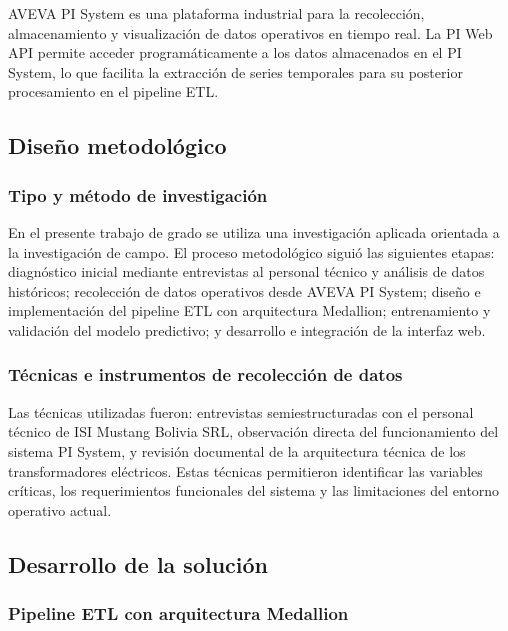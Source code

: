 \documentclass{univalle-perfil}
\begin{document}
AVEVA PI System es una plataforma industrial para la recolección, almacenamiento
y visualización de datos operativos en tiempo real. La PI Web API permite acceder
programáticamente a los datos almacenados en el PI System, lo que facilita la
extracción de series temporales para su posterior procesamiento en el pipeline ETL.


\subsection{Diseño metodológico}

\subsubsection{Tipo y método de investigación}

En el presente trabajo de grado se utiliza una investigación aplicada orientada a la
investigación de campo. El proceso metodológico siguió las siguientes etapas:
diagnóstico inicial mediante entrevistas al personal técnico y análisis de datos
históricos; recolección de datos operativos desde AVEVA PI System; diseño e
implementación del pipeline ETL con arquitectura Medallion; entrenamiento y
validación del modelo predictivo; y desarrollo e integración de la interfaz web.

\subsubsection{Técnicas e instrumentos de recolección de datos}

Las técnicas utilizadas fueron: entrevistas semiestructuradas con el personal técnico
de ISI Mustang Bolivia SRL, observación directa del funcionamiento del sistema
PI System, y revisión documental de la arquitectura técnica de los transformadores
eléctricos. Estas técnicas permitieron identificar las variables críticas, los
requerimientos funcionales del sistema y las limitaciones del entorno operativo actual.

\subsection{Desarrollo de la solución}

\subsubsection{Pipeline ETL con arquitectura Medallion}
\end{document}
